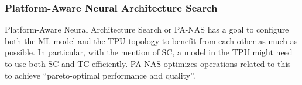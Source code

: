 \subsubsection{Platform-Aware Neural Architecture Search}
Platform-Aware Neural Architecture Search or PA-NAS has a goal to configure both the ML model and the TPU topology to benefit from each other as much as possible.
In particular, with the mention of SC, a model in the TPU might need to use both SC and TC efficiently.
PA-NAS optimizes operations related to this to achieve ``pareto-optimal performance and quality''.